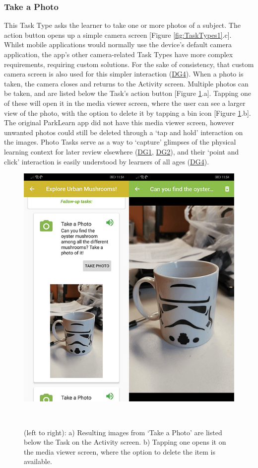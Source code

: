 \subsubsection*{Take a Photo}
This Task Type asks the learner to take one or more photos of a subject. The action button opens up a simple camera screen [Figure \ref{fig:TaskTypes1}.c]. Whilst mobile applications would normally use the device's default camera application, the app's other camera-related Task Types have more complex requirements, requiring custom solutions. For the sake of consistency, that custom camera screen is also used for this simpler interaction (\hyperref[DG4]{DG4}). When a photo is taken, the camera closes and returns to the Activity screen. Multiple photos can be taken, and are listed below the Task's action button [Figure \ref{fig:MediaViewer}.a]. Tapping one of these will open it in the media viewer screen, where the user can see a larger view of the photo, with the option to delete it by tapping a bin icon [Figure \ref{fig:MediaViewer}.b]. The original ParkLearn app did not have this media viewer screen, however unwanted photos could still be deleted through a `tap and hold' interaction on the images. Photo Tasks serve as a way to `capture' glimpses of the physical learning context for later review elsewhere (\hyperref[DG1]{DG1}, \hyperref[DG2]{DG2}), and their `point and click' interaction is easily understood by learners of all ages (\hyperref[DG4]{DG4}).

\begin{figure}
  \centering
  \includegraphics[width=0.55\columnwidth]{images/chapter05/mediaViewer.png}
  \caption[OurPlace's media viewer]{(left to right): a) Resulting images from `Take a Photo' are listed below the Task on the Activity screen. b) Tapping one opens it on the media viewer screen, where the option to delete the item is available.}~\label{fig:MediaViewer}
\end{figure}

